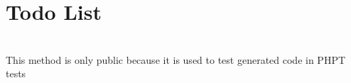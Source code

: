 \chapter{Todo List}
\hypertarget{todo}{}\label{todo}

\begin{DoxyRefList}
\item[Global \doxylink{class_p_h_p_unit_1_1_framework_1_1_mock_object_1_1_generator_1_1_generator_a1cfbf556c77c19f3b48879ba3dd8386d}{Generator\+::generate} (string \$type, bool \$mock\+Object, bool \$mark\+As\+Mock\+Object, ?array \$methods=null, string \$mock\+Class\+Name=\textquotesingle{}\textquotesingle{}, bool \$call\+Original\+Clone=true, bool \$call\+Autoload=true, bool \$clone\+Arguments=true, bool \$call\+Original\+Methods=false)]\hfill \\
\label{todo__todo000001}%
%
This method is only public because it is used to test generated code in PHPT tests
\end{DoxyRefList}